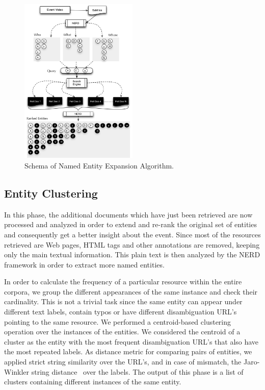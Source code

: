\documentclass{llncs}
\begin{document}
\begin{figure}[h!]
\centering
\includegraphics[width=0.5\textwidth]{figure/ExpansionDiagram}
\caption{Schema of Named Entity Expansion Algorithm.}
\label{fig:namedEntityExpansion}%
\end{figure}

\subsection{Entity Clustering}
In this phase, the additional documents which have just been retrieved are now processed and analyzed in order to extend and re-rank the original set of entities and consequently get a better insight about the event. Since most of the resources retrieved are Web pages, HTML tags and other annotations are removed, keeping only the main textual information. This plain text is then analyzed by the NERD framework in order to extract more named entities.

In order to calculate the frequency of a particular resource within the entire corpora, we group the different appearances of the same instance and check their cardinality. This is not a trivial task since the same entity can appear under different text labels, contain typos or have different disambiguation URL's pointing to the same resource. We performed a centroid-based clustering operation over the instances of the entities. We considered the centroid of a cluster as the entity with the most frequent disambiguation URL's that also have the most repeated labels. As distance metric for comparing pairs of entities, we applied strict string similarity over the URL's, and in case of mismatch, the Jaro-Winkler string distance~\cite{winkler2006overview} over the labels. The output of this phase is a list of clusters containing different instances of the same entity.
\end{document}
